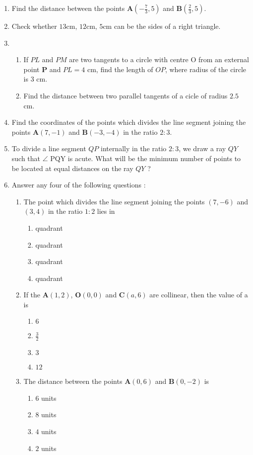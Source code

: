 \documentclass{article}
\let\vec\mathbf
\newcommand{\romanNumeral}[1]{\uppercase\expandafter{\romannumeral#1}}
\begin{document}
\begin{enumerate}
	\item Find the distance between the points $\vec{A}(-\frac{7}{3},5)$ and $\vec{B}(\frac{2}{3},5)$.                  	\item Check whether $13$cm, $12$cm, $5$cm can be the sides of a right triangle.
	\item \begin{enumerate}[label=(\alph*)]
			\item If $PL$ and $PM$ are two tangents to a circle with centre O from an external point $\vec{P}$ and $PL=4$ cm, find the length of $OP$, where radius of the circle is 3 cm.
		\item Find the distance between two parallel tangents of a cicle of radius $2.5$ cm.
             \end{enumerate}
     \item Find the coordinates of the points which divides the line segment joining the points $\vec{A}(7,-1)$ and $\vec{B}(-3,-4)$ in the ratio $2:3$.	

     \item To divide a line segment $QP$ internally in the ratio $2:3$, we draw a ray $QY$ such that $\angle$ PQY is acute. What will be  the minimum number of points to be located at equal distances on the ray $QY$ ?

     \item Answer any four of the following questions :
	     \begin{enumerate}[label=(\roman*)]
		     \item The point which divides the line segment joining the points $(7,-6)$ and $(3,4)$ in the ratio $1:2$ lies in
			     \begin{enumerate}[label=(\Alph*)]
                              \item \romanNumeral{1} quadrant
			      \item \romanNumeral{2} quadrant
			      \item \romanNumeral{3} quadrant
			      \item \romanNumeral{4} quadrant
			     \end{enumerate}
		     \item If the $\vec{A}(1, 2)$, $\vec{O}(0, 0)$ and $\vec{C}(a, 6)$ are collinear, then the value of a is
			     \begin{enumerate}[label=(\Alph*)]
				     \item $6$
				     \item $\frac{3}{2}$
				     \item $3$
				     \item $12$
			     \end{enumerate}
		    \item The distance between the points $\vec{A}(0, 6)$ and $\vec{B}(0, -2)$ is 
			    \begin{enumerate}[label=(\Alph*)]
				    \item $6$ units
				    \item $8$ units
				    \item $4$ units
				    \item $2$ units
	

\end{enumerate}
\end{enumerate}
\end{enumerate}
\end{document}
